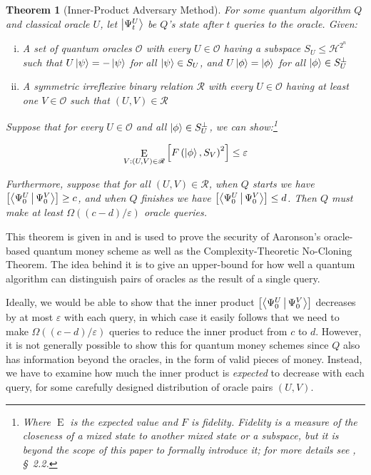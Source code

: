 \documentclass[12pt]{article}
\newtheorem{theorem}{Theorem}
\DeclareMathOperator*{\expected}{E}
\begin{document}
\begin{theorem}[Inner-Product Adversary Method]
For some quantum algorithm $Q$ and classical oracle $U$, let $\Ket{\Psi^U_t}$ be $Q$'s state after $t$ queries to the oracle.  Given:

\begin{enumerate}[(i)]
\item A set of quantum oracles $\mathscr{O}$ with every $U \in \mathscr{O}$ having a subspace $S_U \leq \mathscr{H}^{2^n}$ such that $U\Ket{\psi} = -\Ket{\psi}$ for all $\Ket{\psi} \in S_U$, and $U\Ket{\phi} = \Ket{\phi}$ for all $\Ket{\phi} \in S_U^\perp$
\item A symmetric irreflexive binary relation $\mathscr{R}$ with every $U \in \mathscr{O}$ having at least one $V \in \mathscr{O}$ such that $(U,V) \in \mathscr{R}$
\end{enumerate}

\noindent Suppose that for every $U \in \mathscr{O}$ and all $\Ket{\phi} \in S_U^\perp$, we can show:\footnote{Where $\expected $ is the expected value and $F$ is fidelity.  Fidelity is a measure of the closeness of a mixed state to another mixed state or a subspace, but it is beyond the scope of this paper to formally introduce it; for more details see \cite{Aar13}, \S~2.2.}

$$\expected_{V : (U,V) \in \mathscr{R}} \left[F\left(\Ket{\phi},S_V\right)^2\right] \leq \varepsilon$$

\noindent Furthermore, suppose that for all $(U,V) \in \mathscr{R}$, when $Q$ starts we have $\left[\Braket{\Psi^U_0 | \Psi^V_0}\right] \geq c$, and when $Q$ finishes we have $\left[\Braket{\Psi^U_0 | \Psi^V_0}\right] \leq d$.  Then $Q$ must make at least $\Omega\left((c - d) / \varepsilon\right)$ oracle queries.
\end{theorem}

This theorem is given in \cite{Aar13} and is used to prove the security of Aaronson's oracle-based quantum money scheme as well as the Complexity-Theoretic No-Cloning Theorem.  The idea behind it is to give an upper-bound for how well a quantum algorithm can distinguish pairs of oracles as the result of a single query.

Ideally, we would be able to show that the inner product $\left[\Braket{\Psi^U_0 | \Psi^V_0}\right]$ decreases by at most $\varepsilon$ with each query, in which case it easily follows that we need to make $\Omega((c-d)/\varepsilon)$ queries to reduce the inner product from $c$ to $d$.  However, it is not generally possible to show this for quantum money schemes since $Q$ also has information beyond the oracles, in the form of valid pieces of money.  Instead, we have to examine how much the inner product is \emph{expected} to decrease with each query, for some carefully designed distribution of oracle pairs $(U,V)$.
\end{document}
